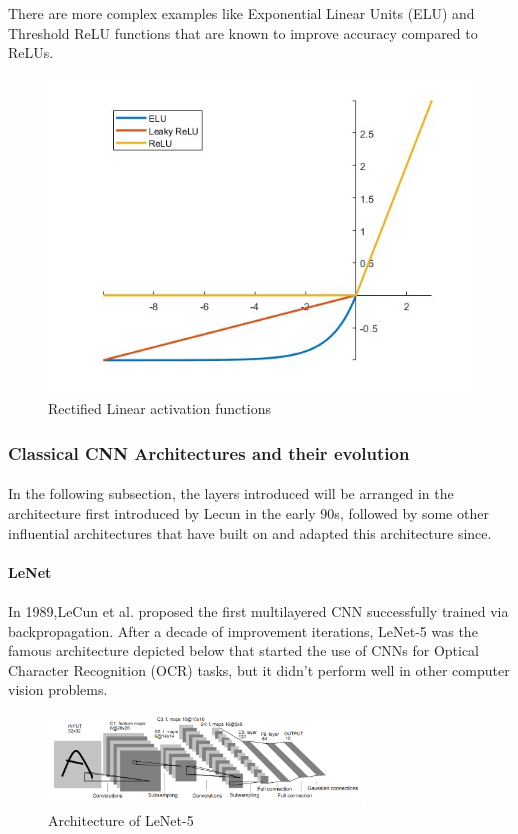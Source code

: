 \documentclass{article}
\begin{document}
There are more complex examples like Exponential Linear Units (ELU) and Threshold ReLU functions that are known to improve accuracy compared to ReLUs.

\begin{figure}[hbt!]
        \centering
        \includegraphics[width=0.65\linewidth]{RELU variations.jpg}
        \caption{Rectified Linear activation functions \cite{leakyreluimg}}
\end{figure}


\subsubsection{Classical CNN Architectures and their evolution}
\paragraph{}
In the following  subsection, the layers introduced will be arranged in the architecture first introduced by Lecun in the early 90s, followed by some other influential architectures that have built on and adapted this architecture since.
\paragraph{LeNet}
\paragraph{}
In 1989,LeCun et al. proposed the first multilayered CNN successfully trained via backpropagation. After a decade of improvement iterations, LeNet-5 \cite{726791} was the famous architecture depicted below that started the use of CNNs for Optical Character Recognition (OCR) tasks, but it didn't perform well in other computer vision problems.

    \begin{figure}[hbt!]
        \centering
        \includegraphics[width=0.75\textwidth]{lenet_arch.png}
        \caption{Architecture of LeNet-5 \cite{726791}}
    \end{figure}
    
\end{document}
